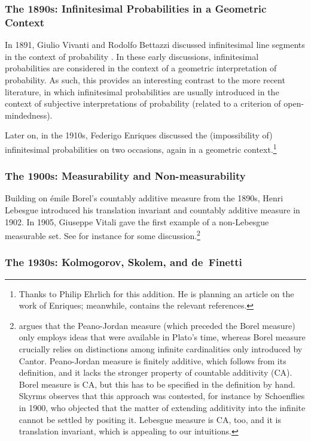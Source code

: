 \subsubsection*{The 1890s: Infinitesimal Probabilities in a Geometric Context}
In 1891, Giulio Vivanti and Rodolfo Bettazzi discussed infinitesimal line segments in the context of probability \citep[see][]{Ehrlich:2006}.
In these early discussions, infinitesimal probabilities are considered in the context of a geometric interpretation of probability. As such, this provides an interesting contrast to the more recent literature, in which infinitesimal probabilities are usually introduced in the context of subjective interpretations of probability (related to a criterion of open-mindedness).

Later on, in the 1910s, Federigo Enriques discussed the (impossibility of) infinitesimal probabilities on two occasions, again in a geometric context.\footnote{Thanks to Philip Ehrlich for this addition. He is planning an article on the work of Enriques; meanwhile, \citet{Ehrlich:2006} contains the relevant references.}

\subsubsection*{The 1900s: Measurability and Non-measurability}
Building on {\'{e}}mile Borel's countably additive measure from the 1890s, Henri Lebesgue introduced his translation invariant and countably additive measure in 1902. In 1905, Giuseppe Vitali gave the first example of a non-Lebesgue measurable set. See for instance \citet{Skyrms:1983a} for some discussion.\footnote{\citet{Skyrms:1983a} argues that the Peano-Jordan measure (which preceded the Borel measure) only employs ideas that were available in Plato's time, whereas Borel measure crucially relies on distinctions among infinite cardinalities only introduced by Cantor. Peano-Jordan measure is finitely additive, which follows from its definition, and it lacks the stronger property of countable additivity (CA). Borel measure is CA, but this has to be specified in the definition by hand. Skyrms observes that this approach was contested, for instance by Schoenflies in 1900, who objected that the matter of extending additivity into the infinite cannot be settled by positing it. Lebesgue measure is CA, too, and it is translation invariant, which is appealing to our intuitions.\label{fn:Schoenflies}}

\subsubsection*{The 1930s: Kolmogorov, Skolem, and de~Finetti}

